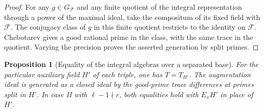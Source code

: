 \documentclass[a4paper,11pt]{article}
\newtheorem{proposition}{Proposition}[section]
\theoremstyle{definition}
\theoremstyle{remark}
\numberwithin{equation}{section}
\begin{document}
\begin{proof}
For any \(g\in G_{\mathcal F}\) and any finite quotient of
the integral representation through a power of the maximal
ideal, take the compositum of its fixed field with
\(\mathcal F\). The conjugacy class of \(g\) in this finite
quotient restricts to the identity on \(\mathcal F\).
Chebotarev gives a good rational prime in the class, with
the same trace in the quotient. Varying the precision proves
the asserted generation by split primes.
\end{proof}

\begin{proposition}[Equality of the integral algebras over a separated base]
\leavevmode\label{prop:separatedalgebra573}
For the particular auxiliary field \(H'\) of each triple,
one has \(T=T_{H'}\). The augmentation ideal is generated
as a closed ideal by the good-prime trace differences at
primes split in \(H'\). In case II with
\(\ell-1\nmid r\), both equalities hold with \(E_xH'\) in
place of \(H'\).
\end{proposition}
\end{document}
